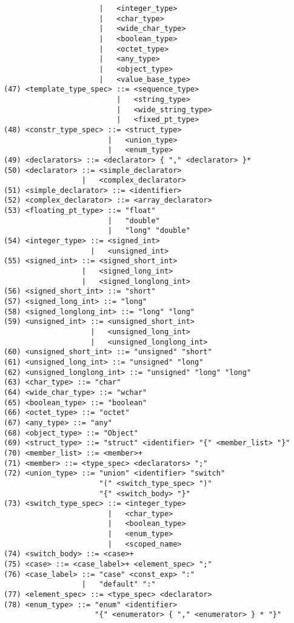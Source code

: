 \begin{verbatim}
                      |   <integer_type> 
                      |   <char_type> 
                      |   <wide_char_type> 
                      |   <boolean_type> 
                      |   <octet_type> 
                      |   <any_type> 
                      |   <object_type> 
                      |   <value_base_type>
(47) <template_type_spec> ::= <sequence_type>
                          |   <string_type> 
                          |   <wide_string_type> 
                          |   <fixed_pt_type>
(48) <constr_type_spec> ::= <struct_type>
                        |   <union_type> 
                        |   <enum_type>
(49) <declarators> ::= <declarator> { "," <declarator> }* 
(50) <declarator> ::= <simple_declarator>
                  |   <complex_declarator>
(51) <simple_declarator> ::= <identifier> 
(52) <complex_declarator> ::= <array_declarator> 
(53) <floating_pt_type> ::= "float"
                        |   "double" 
                        |   "long" "double"
(54) <integer_type> ::= <signed_int>
                    |   <unsigned_int>
(55) <signed_int> ::= <signed_short_int>
                  |   <signed_long_int> 
                  |   <signed_longlong_int>
(56) <signed_short_int> ::= "short" 
(57) <signed_long_int> ::= "long" 
(58) <signed_longlong_int> ::= "long" "long" 
(59) <unsigned_int> ::= <unsigned_short_int>
                    |   <unsigned_long_int> 
                    |   <unsigned_longlong_int>
(60) <unsigned_short_int> ::= "unsigned" "short" 
(61) <unsigned_long_int> ::= "unsigned" "long" 
(62) <unsigned_longlong_int> ::= "unsigned" "long" "long"
(63) <char_type> ::= "char" 
(64) <wide_char_type> ::= "wchar" 
(65) <boolean_type> ::= "boolean" 
(66) <octet_type> ::= "octet" 
(67) <any_type> ::= "any" 
(68) <object_type> ::= "Object" 
(69) <struct_type> ::= "struct" <identifier> "{" <member_list> "}" 
(70) <member_list> ::= <member>+ 
(71) <member> ::= <type_spec> <declarators> ";" 
(72) <union_type> ::= "union" <identifier> "switch" 
                      "(" <switch_type_spec> ")"  
                      "{" <switch_body> "}"
(73) <switch_type_spec> ::= <integer_type>
                        |   <char_type> 
                        |   <boolean_type> 
                        |   <enum_type> 
                        |   <scoped_name>
(74) <switch_body> ::= <case>+ 
(75) <case> ::= <case_label>+ <element_spec> ";" 
(76) <case_label> ::= "case" <const_exp> ":"
                  |   "default" ":"
(77) <element_spec> ::= <type_spec> <declarator> 
(78) <enum_type> ::= "enum" <identifier> 
                     "{" <enumerator> { "," <enumerator> } * "}"

\end{verbatim}
